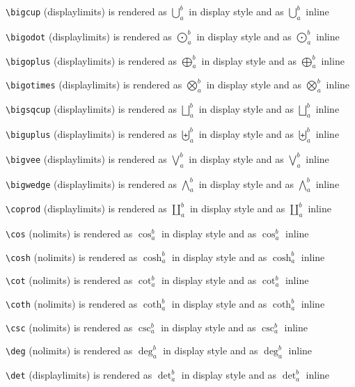 \texttt{\textbackslash bigcup} (displaylimits) is rendered as $\displaystyle \bigcup_a^b$ in display style and as $\bigcup_a^b$ inline

\texttt{\textbackslash bigodot} (displaylimits) is rendered as $\displaystyle \bigodot_a^b$ in display style and as $\bigodot_a^b$ inline

\texttt{\textbackslash bigoplus} (displaylimits) is rendered as $\displaystyle \bigoplus_a^b$ in display style and as $\bigoplus_a^b$ inline

\texttt{\textbackslash bigotimes} (displaylimits) is rendered as $\displaystyle \bigotimes_a^b$ in display style and as $\bigotimes_a^b$ inline

\texttt{\textbackslash bigsqcup} (displaylimits) is rendered as $\displaystyle \bigsqcup_a^b$ in display style and as $\bigsqcup_a^b$ inline

\texttt{\textbackslash biguplus} (displaylimits) is rendered as $\displaystyle \biguplus_a^b$ in display style and as $\biguplus_a^b$ inline

\texttt{\textbackslash bigvee} (displaylimits) is rendered as $\displaystyle \bigvee_a^b$ in display style and as $\bigvee_a^b$ inline

\texttt{\textbackslash bigwedge} (displaylimits) is rendered as $\displaystyle \bigwedge_a^b$ in display style and as $\bigwedge_a^b$ inline

\texttt{\textbackslash coprod} (displaylimits) is rendered as $\displaystyle \coprod_a^b$ in display style and as $\coprod_a^b$ inline

\texttt{\textbackslash cos} (nolimits) is rendered as $\displaystyle \cos_a^b$ in display style and as $\cos_a^b$ inline

\texttt{\textbackslash cosh} (nolimits) is rendered as $\displaystyle \cosh_a^b$ in display style and as $\cosh_a^b$ inline

\texttt{\textbackslash cot} (nolimits) is rendered as $\displaystyle \cot_a^b$ in display style and as $\cot_a^b$ inline

\texttt{\textbackslash coth} (nolimits) is rendered as $\displaystyle \coth_a^b$ in display style and as $\coth_a^b$ inline

\texttt{\textbackslash csc} (nolimits) is rendered as $\displaystyle \csc_a^b$ in display style and as $\csc_a^b$ inline

\texttt{\textbackslash deg} (nolimits) is rendered as $\displaystyle \deg_a^b$ in display style and as $\deg_a^b$ inline

\texttt{\textbackslash det} (displaylimits) is rendered as $\displaystyle \det_a^b$ in display style and as $\det_a^b$ inline


